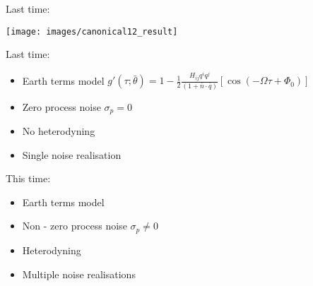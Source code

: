 \documentclass[10pt]{beamer}
\title{}
\subtitle{}
\author{}
\date{EE/GW meeting, May 25, 2023}
\begin{document}
	
	\maketitle
	
	\begin{frame}{}
		
		Last time: 
		
\texttt{[image: images/canonical12\_result]}


\end{frame}


	\begin{frame}{}
	
	Last time: 
	
	\begin{itemize}
		\item Earth terms model $g'(\tau; \bar{\theta}) = 1 - \frac{1}{2} \frac{ H_{ij}q^i q^j }{(1 + \bar{n}\cdot \bar{q}) } \left[ \cos(-\Omega \tau +\Phi_0) \right]$
		\item Zero process noise  $\sigma_p = 0$
		\item No heterodyning
		\item Single noise realisation
    \end{itemize}	

\end{frame}



	\begin{frame}{}
	
	This time: 
	
	\begin{itemize}
		\item Earth terms model 
		\item \alert{Non - zero process noise  $\sigma_p \neq 0$}
		\item \alert{Heterodyning}
		\item \alert{Multiple noise realisations}
	\end{itemize}	
	
\end{frame}
\end{document}
